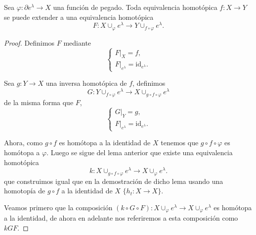 \bigskip

\begin{lemma}
\label{lema2_democwvariedad}
    Sea $\varphi: \partial e^{\lambda} \to X$ una función de pegado. Toda equivalencia homotópica $f:X\to Y$ se puede extender a una equivalencia homotópica 
    \begin{equation*}
        F: X\cup_{\varphi} e^{\lambda} \to Y\cup_{f\circ\varphi} e^{\lambda}.
    \end{equation*}
\end{lemma}
\begin{proof}
    Definimos $F$ mediante
    \begin{equation*}
        \begin{cases}
            F|_X = f, \\
            F|_{e^{\lambda}} = \text{id}_{e^{\lambda}}.
        \end{cases}
    \end{equation*}

    Sea $g:Y\to X$ una inversa homotópica de $f$, definimos
    \begin{equation*}
        G: Y\cup_{f\circ\varphi} e^{\lambda} \to X\cup_{g\circ f\circ\varphi} e^{\lambda}
    \end{equation*}
    de la misma forma que $F$,
    \begin{equation*}
        \begin{cases}
            G|_Y = g, \\
            F|_{e^{\lambda}} = \text{id}_{e^{\lambda}}.
        \end{cases}
    \end{equation*}

    Ahora, como $g\circ f$ es homótopa a la identidad de $X$ tenemos que $g\circ f\circ\varphi$ es homótopa a $\varphi$. Luego se sigue del lema anterior que existe una equivalencia homotópica 
    \begin{equation*}
        k: X\cup_{g\circ f\circ\varphi} e^{\lambda} \to X\cup_{\varphi} e^{\lambda}.
    \end{equation*}
    que construimos igual que en la demostración de dicho lema usando una homotopía de $g\circ f$ a la identidad de $X$ $\{h_t: X \to X\}$.

    Veamos primero que la composición $(k\circ G\circ F):X\cup_{\varphi} e^{\lambda}\to X\cup_{\varphi} e^{\lambda}$ es homótopa a la identidad, de ahora en adelante nos referiremos a esta composición como $kGF$. 
    

\end{proof}
